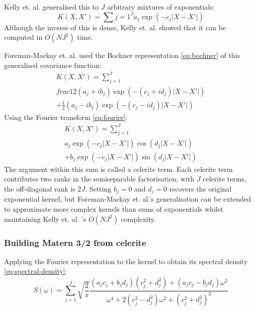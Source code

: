 Kelly et. al. \cite{general-exp} generalised this to $J$ arbitrary mixtures of exponentials:
\begin{equation*}
    K(X, X') = \sum{j=1}^J a_j \exp(-c_j |X - X'|)
\end{equation*}
Although the inverse of this is dense, Kelly et. al. \cite{general-exp} showed that it can be computed in $O(N J^2)$ time.

Foreman-Mackay et. al. \cite{foreman-mackay} used the Bochner representation \ref{eq:bochner} of this generalised covariance function: %
\begin{equation*}
    \begin{aligned}
        K(X, X') = \sum_{j=1}^J \\
        frac{1}{2} (a_j + i b_j) \exp(-(c_j + i d_j) |X - X'|) \\
        + \frac{1}{2} (a_j - i b_j) \exp(-(c_j - i d_j) |X - X'|)
    \end{aligned}
\end{equation*}
Using the Fourier transform \ref{eq:fourier}:
\begin{equation} \label{eq:celerite}
    \begin{aligned}
        K(X, X') = \sum_{j=1}^J \\
        a_j \exp(-c_j |X - X'|) \cos(d_j |X - X'|) \\ 
        + b_j \exp(-c_j |X - X'|) \sin(d_j |X - X'|)
    \end{aligned}
\end{equation}
The argument within this sum is called a celerite term. Each celerite term contributes two ranks in the semiseparable factorisation; with $J$ celerite terms, the off-diagonal rank is $2J$. Setting $b_j = 0$ and $d_j = 0$ recovers the original exponential kernel, but Foreman-Mackay et. al.'s \cite{foreman-mackay} generalisation can be extended to approximate more complex kernels than sums of exponentials whilst maintaining Kelly et. al. \cite{general-exp}'s $O(N J^2)$ complexity.

\subsubsection{Building Matern 3/2 from celerite}
Applying the Fourier representation to the kernel to obtain its spectral density \ref{eq:spectral-density}:
\begin{equation*}
    S(\omega) = \sum_{j=1}^J \sqrt{\frac{2}{\pi}} \frac{(a_j c_j + b_j d_j) (c_j^2 + d_j^2) + (a_j c_j - b_j d_j) \omega^2}{\omega^4 + 2(c_j^2 - d_j^2) \omega^2 + (c_j^2 + d_j^2)^2}
\end{equation*}

